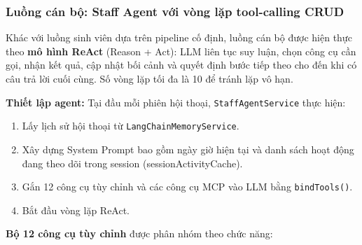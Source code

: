\subsubsection{Luồng cán bộ: Staff Agent với vòng lặp tool-calling CRUD}
Khác với luồng sinh viên dựa trên pipeline cố định, luồng cán bộ được hiện thực theo \textbf{mô hình ReAct} (Reason + Act): LLM liên tục suy luận, chọn công cụ cần gọi, nhận kết quả, cập nhật bối cảnh và quyết định bước tiếp theo cho đến khi có câu trả lời cuối cùng. Số vòng lặp tối đa là 10 để tránh lặp vô hạn.

\textbf{Thiết lập agent:} Tại đầu mỗi phiên hội thoại, \texttt{StaffAgentService} thực hiện:
\begin{enumerate}
	\item Lấy lịch sử hội thoại từ \texttt{LangChainMemoryService}.
	\item Xây dựng System Prompt bao gồm ngày giờ hiện tại và danh sách hoạt động đang theo dõi trong session (sessionActivityCache).
	\item Gắn 12 công cụ tùy chỉnh và các công cụ MCP vào LLM bằng \texttt{bindTools()}.
	\item Bắt đầu vòng lặp ReAct.
\end{enumerate}

\textbf{Bộ 12 công cụ tùy chỉnh} được phân nhóm theo chức năng:

